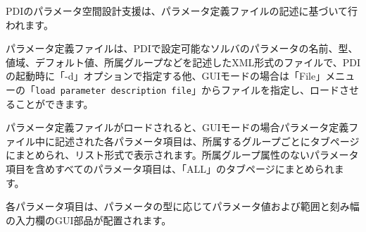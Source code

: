 \documentclass[a4paper,11pt]{jarticle}
\begin{document}
PDIのパラメータ空間設計支援は、パラメータ定義ファイルの記述に基づいて行われます。

パラメータ定義ファイルは、PDIで設定可能なソルバのパラメータの名前、型、値域、デフォルト値、所属グループなどを記述したXML形式のファイルで、PDIの起動時に「-d」オプションで指定する他、GUIモードの場合は「File」メニューの「{\tt load parameter description file}」からファイルを指定し、ロードさせることができます。


パラメータ定義ファイルがロードされると、GUIモードの場合パラメータ定義ファイル中に記述された各パラメータ項目は、所属するグループごとにタブページにまとめられ、リスト形式で表示されます。所属グループ属性のないパラメータ項目を含めすべてのパラメータ項目は、「ALL」のタブページにまとめられます。


各パラメータ項目は、パラメータの型に応じてパラメータ値および範囲と刻み幅の入力欄のGUI部品が配置されます。
\end{document}
